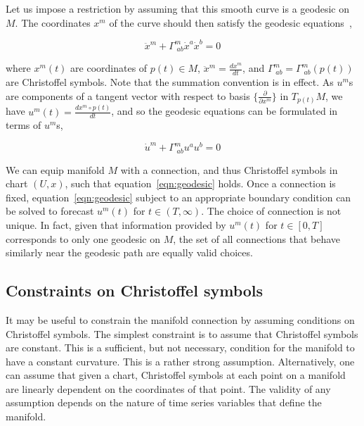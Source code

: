 \documentclass[a4paper,11pt]{elsarticle}
\begin{document}
Let us impose a restriction by assuming that this smooth curve is a
geodesic on $M$. The coordinates $x^{m}$ of the curve should then
satisfy the geodesic equations~\cite{deFelice:1990, schrodinger-1985},

\begin{equation}\label{eqn:geodesic-x}
\ddot{x}^{m} + \Gamma^{m}_{\;ab} \dot{x}^{a} \dot{x}^{b} = 0
\end{equation}

where $x^{m}(t)$ are coordinates of $p(t) \in M$, $\ddot{x}^{m} =
\frac{dx^{m}}{dt}$, and $\Gamma^{m}_{\;ab} = \Gamma^{m}_{\;ab}(p(t))$
are Christoffel symbols. Note that the summation convention is in
effect. As $u^{m}$s are components of a tangent vector with respect to
basis $\{\frac{\partial}{\partial{x^{m}}}\}$ in $T_{p(t)}M$, we have
$u^{m}(t) = \frac{dx^{m} \circ p(t)}{dt}$, and so the geodesic
equations can be formulated in terms of $u^{m}$s,

\begin{equation}\label{eqn:geodesic}
\dot{u}^{m} + \Gamma^{m}_{\;ab} u^{a} u^{b} = 0
\end{equation}

We can equip manifold $M$ with a connection, and thus Christoffel
symbols in chart $(U,x)$, such that equation~\ref{eqn:geodesic}
holds. Once a connection is fixed, equation~\ref{eqn:geodesic} subject
to an appropriate boundary condition can be solved to forecast
$u^{m}(t)$ for $t \in (T, \infty)$. The choice of connection is not
unique. In fact, given that information provided by $u^{m}(t)$ for $t
\in [0,T]$ corresponds to only one geodesic on $M$, the set of all
connections that behave similarly near the geodesic path are equally
valid choices.

\subsection{Constraints on Christoffel symbols}
\label{subsection:chrostoffel-constraints}

It may be useful to constrain the manifold connection by assuming
conditions on Christoffel symbols. The simplest constraint is to
assume that Christoffel symbols are constant. This is a sufficient,
but not necessary, condition for the manifold to have a constant
curvature. This is a rather strong assumption. Alternatively, one can
assume that given a chart, Christoffel symbols at each point on a
manifold are linearly dependent on the coordinates of that point. The
validity of any assumption depends on the nature of time series
variables that define the manifold.
\end{document}
